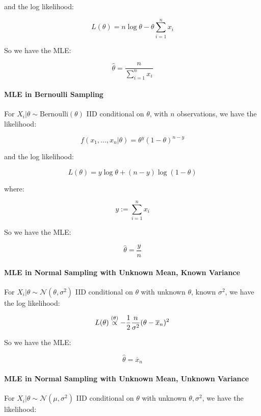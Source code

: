 \documentclass[a4paper]{article}
\begin{document}
                and the log likelihood:

                \[
                    L(\theta) = n\log{\theta} - \theta\sum_{i=1}^n x_i
                \]

                So we have the MLE:

                \[
                    \widehat \theta = \frac{n}{\sum\limits_{i=1}^n x_i}
                \]

            \paragraph{MLE in Bernoulli Sampling}
                For $X_i | \theta \sim \text{Bernoulli}(\theta)$ IID conditional
                on $\theta$, with $n$ observations, we have the likelihood:

                \[
                    f(x_1, ..., x_n | \theta) = \theta^y (1 - \theta)^{n - y}
                \]

                and the log likelihood:

                \[
                    L(\theta) = y\log{\theta} + (n - y)\log(1 - \theta)
                \]

                where:

                \[
                    y := \sum_{i=1}^n x_i
                \]

                So we have the MLE:

                \[
                    \widehat \theta = \frac{y}{n}
                \]

            \paragraph{MLE in Normal Sampling with Unknown Mean, Known Variance}
                For $X_i | \theta \sim \mathcal{N}(\theta, \sigma^2)$ IID
                conditional on $\theta$ with unknown $\theta$, known $\sigma^2$,
                we have the log likelihood:

                \[
                    L(\theta) \stackrel{({\theta})}{\propto} -\frac{1}{2}\frac{n}{\sigma^2}
                    (\theta - \overline x_n)^2
                \]

                So we have the MLE:

                \[
                    \widehat \theta = \overline x_n
                \]

            \paragraph{MLE in Normal Sampling with Unknown Mean, Unknown
            Variance}
                For $X_i | \theta \sim \mathcal{N}(\mu, \sigma^2)$ IID
                conditional on $\theta$ with unknown $\theta, \sigma^2$, we have
                the likelihood:
\end{document}
